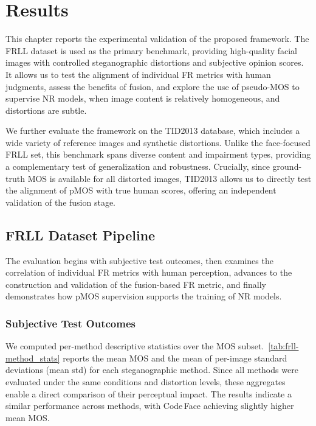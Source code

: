 \chapter{Results}\label{chap:results}

This chapter reports the experimental validation of the proposed framework. The \acs{FRLL} dataset is used as the primary benchmark, providing high-quality facial images with controlled steganographic distortions and subjective opinion scores. It allows us to test the alignment of individual \acs{FR} metrics with human judgments, assess the benefits of fusion, and explore the use of pseudo-\acs{MOS} to supervise \acs{NR} models, when image content is relatively homogeneous, and distortions are subtle.

We further evaluate the framework on the \acs{TID}2013 database, which includes a wide variety of reference images and synthetic distortions. Unlike the face-focused \acs{FRLL} set, this benchmark spans diverse content and impairment types, providing a complementary test of generalization and robustness. Crucially, since ground-truth \acs{MOS} is available for all distorted images, \acs{TID}2013 allows us to directly test the alignment of \acs{pMOS} with true human scores, offering an independent validation of the fusion stage.

\section{\acl{FRLL} Dataset Pipeline}\label{sec:frll-dataset}

The evaluation begins with subjective test outcomes, then examines the correlation of individual \acs{FR} metrics with human perception, advances to the construction and validation of the fusion-based \acs{FR} metric, and finally demonstrates how \acs{pMOS} supervision supports the training of \acs{NR} models.

\subsection{Subjective Test Outcomes}

We computed per-method descriptive statistics over the \acs{MOS} subset.~\autoref{tab:frll-method_stats} reports the mean \acs{MOS} and the mean of per-image standard deviations (mean std) for each steganographic method. Since all methods were evaluated under the same conditions and distortion levels, these aggregates enable a direct comparison of their perceptual impact. The results indicate a similar performance across methods, with Code\,Face achieving slightly higher mean \acs{MOS}.

